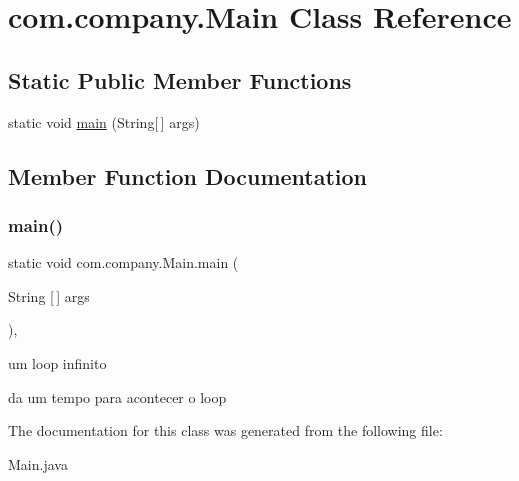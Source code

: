 \hypertarget{classcom_1_1company_1_1_main}{}\section{com.\+company.\+Main Class Reference}
\label{classcom_1_1company_1_1_main}
\subsection*{Static Public Member Functions}
\begin{DoxyCompactItemize}
\item 
static void \mbox{\hyperlink{classcom_1_1company_1_1_main_a6bc3d68479e38e54554042566ab5e157}{main}} (String\mbox{[}$\,$\mbox{]} args)
\end{DoxyCompactItemize}


\subsection{Member Function Documentation}
\mbox{\label{classcom_1_1company_1_1_main_a6bc3d68479e38e54554042566ab5e157}} 
\subsubsection{\texorpdfstring{main()}{main()}}
{\footnotesize\ttfamily static void com.\+company.\+Main.\+main (\begin{DoxyParamCaption}\item[{String \mbox{[}$\,$\mbox{]}}]{args }\end{DoxyParamCaption})\hspace{0.3cm}{\ttfamily [inline]}, {\ttfamily [static]}}

um loop infinito

da um tempo para acontecer o loop 

The documentation for this class was generated from the following file\+:\begin{DoxyCompactItemize}
\item 
Main.\+java\end{DoxyCompactItemize}
